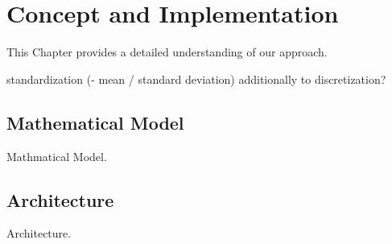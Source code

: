 \chapter{Concept and Implementation}
\label{chapter:conceptApproachSolution}


This Chapter provides a detailed understanding of our approach.

standardization (- mean / standard deviation) additionally to discretization?

\section{Mathematical Model}
\label{subsec:mathModel}

Mathmatical Model.

\section{Architecture}

Architecture.

